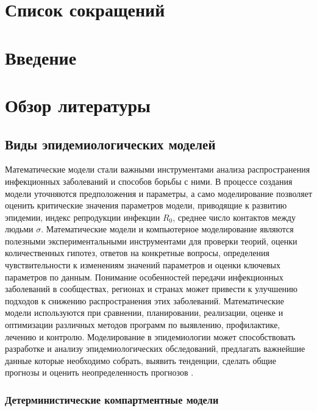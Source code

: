 \documentclass[a4paper,12pt]{article} %
\begin{document}
\tableofcontents
\newpage
\section{Список сокращений}



\printacronyms
\newpage
\section{Введение}

\newpage
\section{Обзор литературы}
\subsection{Виды эпидемиологических моделей}

Математические модели стали важными инструментами анализа распространения инфекционных заболеваний и способов борьбы с ними. В процессе создания модели уточняются предположения и параметры, а само моделирование позволяет оценить критические значения параметров модели, приводящие к развитию эпидемии, индекс репродукции инфекции $R_0$, среднее число контактов между людьми $\sigma$. Математические модели и компьютерное моделирование являются полезными экспериментальными инструментами для проверки теорий, оценки количественных гипотез, ответов на конкретные вопросы, определения чувствительности к изменениям значений параметров и оценки ключевых параметров по данным. Понимание особенностей передачи инфекционных заболеваний в сообществах, регионах и странах может привести к улучшению подходов к снижению распространения этих заболеваний. Математические модели используются при сравнении, планировании, реализации, оценке и оптимизации различных методов
программ по выявлению, профилактике, лечению и контролю. Моделирование в эпидемиологии может способствовать разработке и анализу эпидемиологических обследований, предлагать важнейшие данные которые необходимо собрать, выявить тенденции, сделать общие прогнозы и оценить неопределенность прогнозов \cite{hethcote2000mathematics, hethcote1989three,hethcote1992transmission}.

\subsubsection{Детерминистические компартментные модели}
\end{document}
